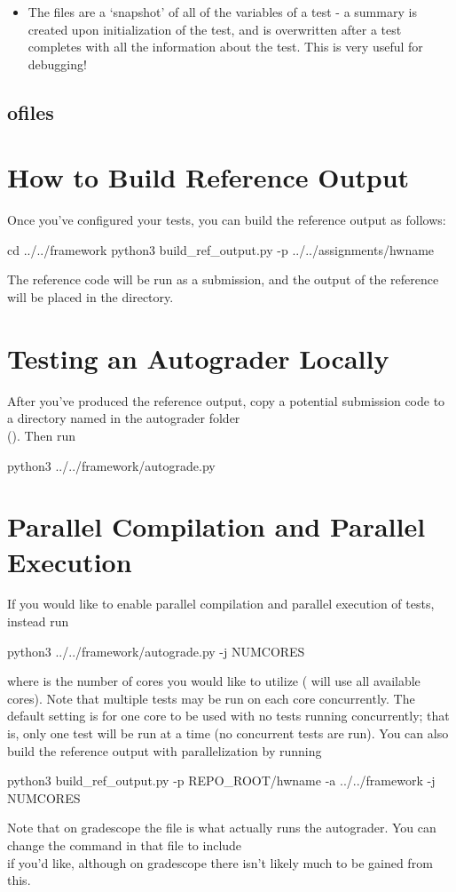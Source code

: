 \documentclass[11pt]{report}
\begin{document}
\begin{itemize}
      \item The  files are a 
      `snapshot' of all of the variables of a test - a summary is created upon initialization of the test, 
      and is overwritten after a test completes with all the information about the test. This is very useful
      for debugging!
\end{itemize}


\subsection*{ofiles}

\section*{How to Build Reference Output}
Once you've configured your tests, you can build the reference output as follows:
\begin{bashcodeblock}
cd ../../framework
python3 build_ref_output.py -p ../../assignments/hwname
\end{bashcodeblock}
The reference code will be run as a submission, and the output of the reference will be placed in 
the  directory.

\section*{Testing an Autograder Locally}
After you've produced the reference output, copy a potential submission code to a directory named 
 in the autograder folder \\(). Then run 
\begin{bashcodeblock}
python3 ../../framework/autograde.py
\end{bashcodeblock}

\section*{Parallel Compilation and Parallel Execution}
If you would like to enable parallel compilation and parallel execution of tests, instead run 
\begin{bashcodeblock}
python3 ../../framework/autograde.py -j NUMCORES
\end{bashcodeblock}
where  is the number of cores 
you would like to utilize ( will use all available cores). Note that multiple tests may be 
run on each core concurrently. The default setting is for one core to be used with no tests running 
concurrently; that is, only one test will be run at a time (no concurrent tests are run). You can
also build the reference output with parallelization by running 
\begin{bashcodeblock}
python3 build_ref_output.py -p REPO_ROOT/hwname -a ../../framework -j NUMCORES
\end{bashcodeblock}
Note that on gradescope the file  is what actually runs the autograder. You can 
change the command in that file to include \\ if you'd like, although on 
gradescope there isn't likely much to be gained from this.  
\end{document}

